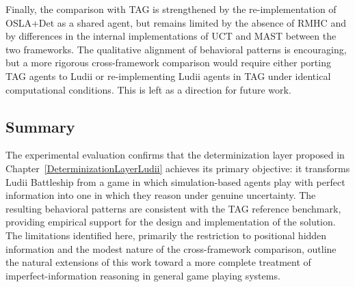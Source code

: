 Finally, the comparison with TAG is strengthened by the re-implementation 
of OSLA+Det as a shared agent, but remains limited by the absence 
of RMHC and by differences in the internal implementations of 
UCT and MAST between the two frameworks. The qualitative alignment of behavioral patterns is encouraging, but a more rigorous cross-framework comparison would require either porting TAG agents to Ludii or re-implementing Ludii agents in TAG under identical computational conditions. This is left as a direction for future work.

\subsection{Summary}

The experimental evaluation confirms that the determinization layer proposed in Chapter~\ref{DeterminizationLayerLudii} achieves its primary objective: it transforms Ludii Battleship from a game in which simulation-based agents play with perfect information into one in which they reason under genuine uncertainty. The resulting behavioral patterns are consistent with the TAG reference benchmark, providing empirical support for the design and implementation of the solution. The limitations identified here, primarily the restriction to positional hidden information and the modest nature of the cross-framework comparison, outline the natural extensions of this work toward a more complete treatment of imperfect-information reasoning in general game playing systems.
